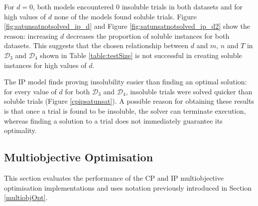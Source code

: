 \documentclass{mpaper}
\begin{document}
For $d = 0$, both models encountered 0 insoluble trials in both datasets and for high values of $d$ none of the models found soluble trials. Figure \ref{fig:satunsatnotsolved_ip_d} and Figure \ref{fig:satunsatnotsolved_ip_d2} show the reason: increasing $d$ decreases the proportion of soluble instances for both datasets. This suggests that the chosen relationship between $d$ and $m$, $n$ and $T$ in $\mathcal{D}_3$ and $\mathcal{D}_4$ shown in Table \ref{table:testSize} is not successful in creating soluble instances for high values of $d$.

The IP model finds proving insolubility easier than finding an optimal solution: for every value of $d$ for both $\mathcal{D}_3$ and $\mathcal{D}_4$, insoluble trials were solved quicker than soluble trials (Figure \ref{cpipsatunsat}). A possible reason for obtaining these results is that once a trial is found to be insoluble, the solver can terminate execution, whereas finding a solution to a trial does not immediately guarantee its optimality.

\subsection{Multiobjective Optimisation}
\label{experiments:multiobjective}

This section evaluates the performance of the CP and IP multiobjective optimisation implementations and uses notation previously introduced in Section \ref{multiobjOpt}.
\end{document}
